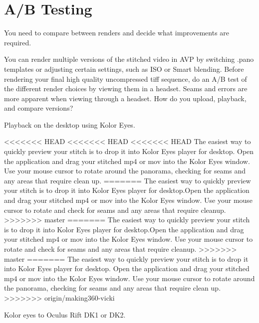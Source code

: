 \chapter{A/B Testing}
\pagecolor{white}
\label{chap:46}
\begin{fullwidth}

\problem

{\large You need to compare between renders and decide what improvements are required. \par}

You can render multiple versions of the stitched video in AVP by switching .pano templates or adjusting certain settings, such as ISO or Smart blending. Before rendering your final high quality uncompressed tiff sequence, do an A/B test of the different render choices by viewing them in a headset. Seams and errors are more apparent when viewing through a headset. How do you upload, playback, and compare versions?

\solutions

{\large Playback on the desktop using Kolor Eyes. \par}


<<<<<<< HEAD
<<<<<<< HEAD
<<<<<<< HEAD
The easiest way to quickly preview your stitch is to drop it into Kolor Eyes player for desktop. Open the application and drag your stitched mp4 or mov into the Kolor Eyes window. Use your mouse cursor to rotate around the panorama, checking for seams and any areas that require clean up.  
=======
The easiest way to quickly preview your stitch is to drop it into Kolor Eyes player for desktop.Open the application and drag your stitched mp4 or mov into the Kolor Eyes window. Use your mouse cursor to rotate and check for seams and any areas that require cleanup.
>>>>>>> master
=======
The easiest way to quickly preview your stitch is to drop it into Kolor Eyes player for desktop.Open the application and drag your stitched mp4 or mov into the Kolor Eyes window. Use your mouse cursor to rotate and check for seams and any areas that require cleanup.
>>>>>>> master
=======
The easiest way to quickly preview your stitch is to drop it into Kolor Eyes player for desktop. Open the application and drag your stitched mp4 or mov into the Kolor Eyes window. Use your mouse cursor to rotate around the panorama, checking for seams and any areas that require clean up.  
>>>>>>> origin/making360-vicki

{\large Kolor eyes to Oculus Rift DK1 or DK2. \par}


\end{fullwidth}
